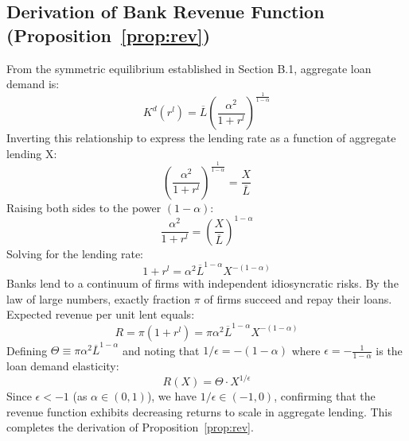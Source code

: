 \documentclass[12pt]{article}
\begin{document}
\subsection{Derivation of Bank Revenue Function (Proposition~\ref{prop:rev})}
\label{app:deriv-revenue}
From the symmetric equilibrium established in Section B.1, aggregate loan demand is:
\begin{equation}
K^{d}(r^{l}) = \overline{L}\left(\frac{\alpha^{2}}{1+r^{l}}\right)^{\frac{1}{1-\alpha}}
\end{equation}
Inverting this relationship to express the lending rate as a function of aggregate lending X:
\begin{equation}
\left(\frac{\alpha^{2}}{1+r^{l}}\right)^{\frac{1}{1-\alpha}} = \frac{X}{\overline{L}}
\end{equation}
Raising both sides to the power $(1-\alpha)$:
\begin{equation}
\frac{\alpha^{2}}{1+r^{l}} = \left(\frac{X}{\overline{L}}\right)^{1-\alpha}
\end{equation}
Solving for the lending rate:
\begin{equation}
1+r^{l} = \alpha^{2}\overline{L}^{1-\alpha}X^{-(1-\alpha)}
\end{equation}
Banks lend to a continuum of firms with independent idiosyncratic risks. By the law of large numbers, exactly fraction $\pi$ of firms succeed and repay their loans. Expected revenue per unit lent equals:
\begin{equation}
R = \pi(1+r^{l}) = \pi\alpha^{2}\overline{L}^{1-\alpha}X^{-(1-\alpha)}
\end{equation}
Defining $\Theta \equiv \pi\alpha^{2}\overline{L}^{1-\alpha}$ and noting that $1/\epsilon = -(1-\alpha)$ where $\epsilon = -\frac{1}{1-\alpha}$ is the loan demand elasticity:
\begin{equation}
R(X) = \Theta \cdot X^{1/\epsilon}
\end{equation}
Since $\epsilon < -1$ (as $\alpha \in (0,1)$), we have $1/\epsilon \in (-1,0)$, confirming that the revenue function exhibits decreasing returns to scale in aggregate lending. This completes the derivation of Proposition~\ref{prop:rev}.
\end{document}
